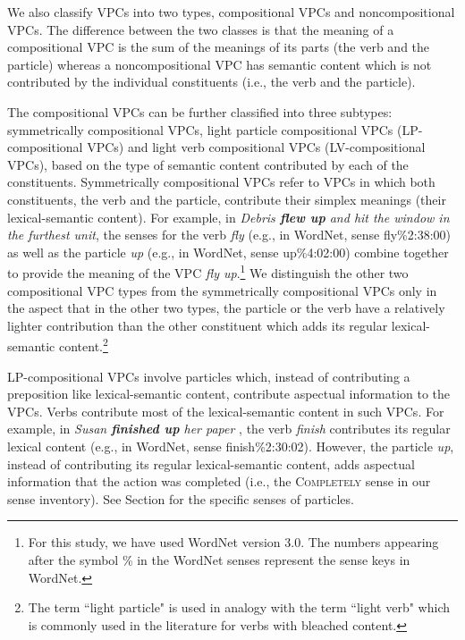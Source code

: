 \documentclass[output=paper
,modfonts
,nonflat]{langsci/langscibook}
\begin{document}
We also classify VPCs into two types, compositional VPCs and noncompositional VPCs. The difference between the two classes is that the meaning of a compositional VPC is the sum of the meanings of its parts (the verb and the particle) whereas a noncompositional VPC %
has semantic content which is not contributed by the individual constituents (i.e., the verb and the particle). 

The compositional VPCs can be further classified into three subtypes: symmetrically compositional VPCs, light particle compositional VPCs (LP-compositional VPCs) and light verb compositional VPCs (LV-compositional VPCs), based on the type of semantic content contributed by each of the constituents. Symmetrically compositional VPCs refer to VPCs in which both constituents, the verb and the particle, contribute their simplex meanings (their lexical-semantic content). For example, in \textit{Debris \textbf{flew up} and hit the window in the furthest unit}, the senses for the verb \textit{fly} (e.g., in WordNet, sense fly\%2:38:00) as well as the particle \textit{up} (e.g., in WordNet, sense up\%4:02:00) combine together to provide the meaning of the VPC \textit{fly up}.\footnote{For this study, we have used WordNet version 3.0. The numbers appearing after the symbol \% in the WordNet senses represent the sense keys in WordNet.} We distinguish the other two compositional VPC types from the symmetrically compositional VPCs only in the aspect that in the other two types, the particle or the verb have a relatively lighter contribution than the other constituent which adds its regular lexical-semantic content.\footnote{The term ``light particle" is used in analogy with the term ``light verb" which is commonly used in the literature for verbs with bleached content.} 

LP-compositional VPCs involve particles which, instead of contributing a preposition like lexical-semantic content, contribute aspectual information to the VPCs. Verbs contribute most of the lexical-semantic content in such VPCs. For example, in \textit{Susan \textbf{finished up} her paper} \citep{Ban03b}, the verb \textit{finish} contributes its regular lexical content (e.g., in WordNet, sense finish\%2:30:02). However, the particle \textit{up}, instead of contributing its regular lexical-semantic content, adds aspectual information that the action was completed (i.e., the \textsc{Completely} sense in our sense inventory). See Section  for the specific senses of particles. 
\end{document}
